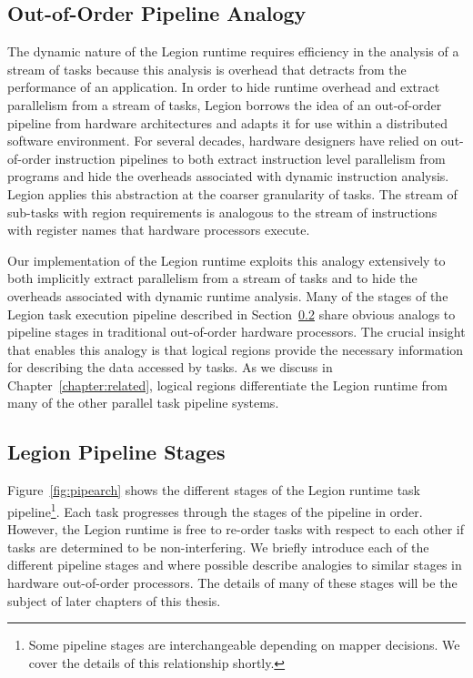 \subsection{Out-of-Order Pipeline Analogy}
\label{subsec:pipeline}
The dynamic nature of the Legion runtime requires
efficiency in the analysis of a stream of tasks
because this analysis is overhead that
detracts from the performance of an application.
In order to hide runtime overhead and extract
parallelism from a stream of tasks, Legion 
borrows the idea of an out-of-order
pipeline from hardware architectures and adapts 
it for use within a distributed software environment.
For several decades, hardware designers have relied on 
out-of-order instruction pipelines to both extract 
instruction level parallelism from programs and hide the
overheads associated with dynamic instruction
analysis. Legion applies this abstraction
at the coarser granularity of tasks. The
stream of sub-tasks with region requirements is 
analogous to the stream of instructions with register
names that hardware processors execute.

Our implementation of the Legion runtime exploits this
analogy extensively to both implicitly extract
parallelism from a stream of tasks and to hide the overheads 
associated with dynamic runtime analysis. Many of the
stages of the Legion task execution pipeline described
in Section~\ref{subsec:stages} share obvious analogs
to pipeline stages in traditional out-of-order hardware
processors. The crucial insight that enables this analogy 
is that logical regions provide the necessary information
for describing the data accessed by tasks. As we discuss
in Chapter~\ref{chapter:related}, logical regions 
differentiate the Legion runtime from many of the other
parallel task pipeline systems.

\subsection{Legion Pipeline Stages}
\label{subsec:stages}
Figure~\ref{fig:pipearch} shows the different stages
of the Legion runtime task pipeline\footnote{Some pipeline
stages are interchangeable depending on mapper decisions.
We cover the details of this relationship shortly.}. Each 
task progresses through the stages of the pipeline in order. 
However, the Legion runtime is free to re-order tasks with
respect to each other if tasks are determined to be 
non-interfering. We briefly introduce each of the 
different pipeline stages and where possible describe
analogies to similar stages in hardware out-of-order
processors. The details of many of these stages will
be the subject of later chapters of this thesis.

